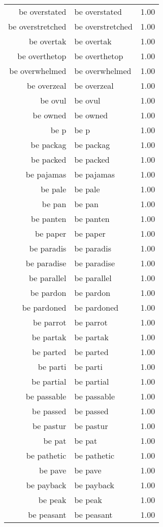 \begin{table}[ht]
\begin{tabular}{rlr}
  be overstated & be overstated & 1.00 \\ 
  be overstretched & be overstretched & 1.00 \\ 
  be overtak & be overtak & 1.00 \\ 
  be overthetop & be overthetop & 1.00 \\ 
  be overwhelmed & be overwhelmed & 1.00 \\ 
  be overzeal & be overzeal & 1.00 \\ 
  be ovul & be ovul & 1.00 \\ 
  be owned & be owned & 1.00 \\ 
  be p & be p & 1.00 \\ 
  be packag & be packag & 1.00 \\ 
  be packed & be packed & 1.00 \\ 
  be pajamas & be pajamas & 1.00 \\ 
  be pale & be pale & 1.00 \\ 
  be pan & be pan & 1.00 \\ 
  be panten & be panten & 1.00 \\ 
  be paper & be paper & 1.00 \\ 
  be paradis & be paradis & 1.00 \\ 
  be paradise & be paradise & 1.00 \\ 
  be parallel & be parallel & 1.00 \\ 
  be pardon & be pardon & 1.00 \\ 
  be pardoned & be pardoned & 1.00 \\ 
  be parrot & be parrot & 1.00 \\ 
  be partak & be partak & 1.00 \\ 
  be parted & be parted & 1.00 \\ 
  be parti & be parti & 1.00 \\ 
  be partial & be partial & 1.00 \\ 
  be passable & be passable & 1.00 \\ 
  be passed & be passed & 1.00 \\ 
  be pastur & be pastur & 1.00 \\ 
  be pat & be pat & 1.00 \\ 
  be pathetic & be pathetic & 1.00 \\ 
  be pave & be pave & 1.00 \\ 
  be payback & be payback & 1.00 \\ 
  be peak & be peak & 1.00 \\ 
  be peasant & be peasant & 1.00 \\ 

\end{tabular}
\end{table}
